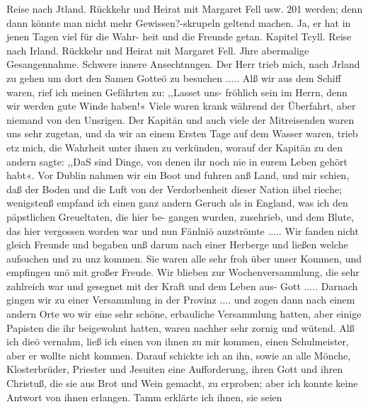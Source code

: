 Reise nach Jtland. Rückkehr und Heirat mit Margaret Fell usw. 201
werden; denn dann könnte man nicht mehr Gewissen?-skrupeln
geltend machen. Ja, er hat in jenen Tagen viel für die Wahr-
heit und die Freunde getan.
Kapitel Tcyll.
Reise nach Irland. Rückkehr nnd Heirat mit Margaret Fell.
Jhre abermalige Gesangennahme. Schwere innere Ansechtnngen.
Der Herr trieb mich, nach Jrland zu gehen um dort den
Samen Gotteö zu besuchen ..... Alß wir aus dem Schiff
waren, rief ich meinen Gefährten zu: ,,Lasset uns- fröhlich sein
im Herrn, denn wir werden gute Winde haben!« Viele waren
krank während der Überfahrt, aber niemand von den Unsrigen.
Der Kapitän und auch viele der Mitreisenden waren uns sehr
zugetan, und da wir an einem Ersten Tage auf dem Wasser
waren, trieb etz mich, die Wahrheit unter ihnen zu verkünden,
worauf der Kapitän zu den andern sagte: ,,DaS sind Dinge, von
denen ihr noch nie in eurem Leben gehört habt«. Vor Dublin
nahmen wir ein Boot und fuhren anß Land, und mir schien, daß
der Boden und die Luft von der Verdorbenheit dieser Nation
iibel rieche; wenigstenß empfand ich einen ganz andern Geruch als
in England, was ich den päpstlichen Greueltaten, die hier be-
gangen wurden, zusehrieb, und dem Blute, das hier vergossen
worden war und nun Fänlniö auzströmte ..... Wir fanden
nicht gleich Freunde und begaben unß darum nach einer Herberge
und ließen welche aufsuchen und zu unz kommen. Sie waren
alle sehr froh über unser Kommen, und empfingen unö mit großer
Freude. Wir blieben zur Wochenversammlung, die sehr zahlreich
war und gesegnet mit der Kraft und dem Leben aus- Gott .....
Darnach gingen wir zu einer Versammlung in der Provinz ....
und zogen dann nach einem andern Orte wo wir eine sehr schöne,
erbauliche Versammlung hatten, aber einige Papisten die ihr
beigewohnt hatten, waren nachher sehr zornig und wütend. Alß
ich dieö vernahm, ließ ich einen von ihnen zu mir kommen, einen
Schulmeister, aber er wollte nicht kommen. Darauf schickte ich
an ihn, sowie an alle Mönche, Klosterbrüder, Priester und Jesuiten
eine Aufforderung, ihren Gott und ihren Christuß, die sie aus
Brot und Wein gemacht, zu erproben; aber ich konnte keine
Antwort von ihnen erlangen. Tamm erklärte ich ihnen, sie seien



